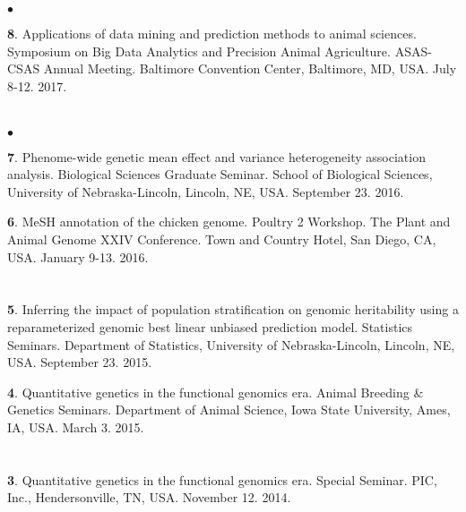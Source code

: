\documentclass[margin,line,10pt]{res}
\newenvironment{list1}{
  \begin{list}{\ding{113}}{%
      \setlength{\itemsep}{0in}
      \setlength{\parsep}{0in} \setlength{\parskip}{0in}
      \setlength{\topsep}{0in} \setlength{\partopsep}{0in} 
      \setlength{\leftmargin}{0.17in}}}{\end{list}}
\newenvironment{list2}{
  \begin{list}{$\bullet$}{%
      \setlength{\itemsep}{0in}
      \setlength{\parsep}{0in} \setlength{\parskip}{0in}
      \setlength{\topsep}{0in} \setlength{\partopsep}{0in} 
      \setlength{\leftmargin}{0.2in}}}{\end{list}}
\begin{document}
\begin{resume}
\begin{list2}
  \vspace{0.5cm}
  
  \item [{\bf 8}.] Applications of data mining and prediction methods to animal sciences. Symposium on Big Data Analytics and Precision Animal Agriculture. ASAS-CSAS Annual Meeting. Baltimore Convention Center, Baltimore, MD, USA. July 8-12. 2017.
  
\end{list2}



\section{}
\begin{list2}
\item [{\bf 7}.] Phenome-wide genetic mean effect and variance heterogeneity association analysis. Biological Sciences Graduate Seminar. School of Biological Sciences, University of Nebraska-Lincoln, Lincoln, NE, USA. September 23. 2016.
  
  \vspace{0.5cm}
  
  \item [{\bf 6}.] MeSH annotation of the chicken genome. Poultry 2 Workshop. The Plant and Animal Genome XXIV Conference. Town and Country Hotel, San Diego, CA, USA. January 9-13. 2016.
  
\end{list2}

\section{}
\begin{list1}
\item [{\bf 5}.] Inferring the impact of population stratification on genomic heritability using a reparameterized genomic best linear unbiased prediction model. Statistics Seminars. Department of Statistics, University of Nebraska-Lincoln, Lincoln, NE, USA. September 23. 2015.

  \vspace{0.5cm}

\item [{\bf 4}.] Quantitative genetics in the functional genomics era. Animal Breeding \& Genetics Seminars. Department of Animal Science, Iowa State University, Ames, IA, USA. March 3. 2015.
\end{list1}

\section{}
\begin{list1}
\item [{\bf 3}.] Quantitative genetics in the functional genomics era. Special Seminar. PIC, Inc., Hendersonville, TN, USA.  November 12. 2014.
\end{list1}


\end{resume}
\end{document}
